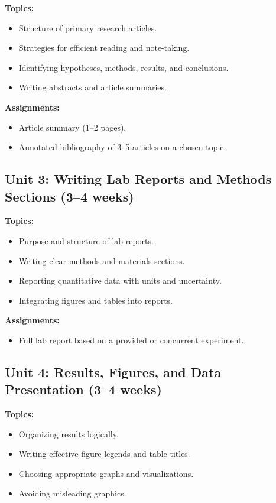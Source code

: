 \documentclass[12pt,oneside]{book}
\begin{document}
\textbf{Topics:}
\begin{itemize}
    \item Structure of primary research articles.
    \item Strategies for efficient reading and note-taking.
    \item Identifying hypotheses, methods, results, and conclusions.
    \item Writing abstracts and article summaries.
\end{itemize}

\textbf{Assignments:}
\begin{itemize}
    \item Article summary (1–2 pages).
    \item Annotated bibliography of 3–5 articles on a chosen topic.
\end{itemize}

\subsection{Unit 3: Writing Lab Reports and Methods Sections (3--4 weeks)}

\textbf{Topics:}
\begin{itemize}
    \item Purpose and structure of lab reports.
    \item Writing clear methods and materials sections.
    \item Reporting quantitative data with units and uncertainty.
    \item Integrating figures and tables into reports.
\end{itemize}

\textbf{Assignments:}
\begin{itemize}
    \item Full lab report based on a provided or concurrent experiment.
\end{itemize}

\subsection{Unit 4: Results, Figures, and Data Presentation (3--4 weeks)}

\textbf{Topics:}
\begin{itemize}
    \item Organizing results logically.
    \item Writing effective figure legends and table titles.
    \item Choosing appropriate graphs and visualizations.
    \item Avoiding misleading graphics.
\end{itemize}
\end{document}
